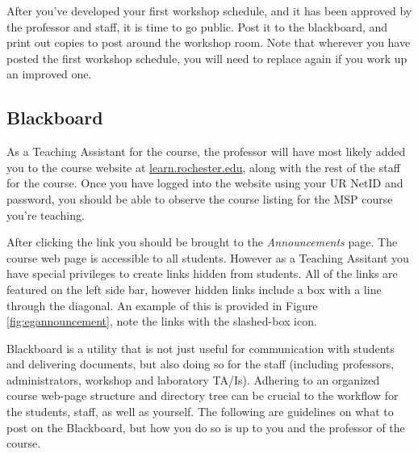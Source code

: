 \documentclass[12pt]{article}
\begin{document}
\indent After you've developed your first workshop schedule, and it has been approved by the professor and staff, it is time to go public. Post it to the blackboard, and print out copies to post around the workshop room. Note that wherever you have posted the first workshop schedule, you will need to replace again if you work up an improved one.

\subsection{Blackboard} \label{sec:bb}

As a Teaching Assistant for the course, the professor will have most likely added you to the course website at \url{learn.rochester.edu}, along with the rest of the staff for the course. Once you have logged into the website using your UR NetID and password, you should be able to observe the course listing for the MSP course you're teaching. 

\indent After clicking the link you should be brought to the \emph{Announcements} page. The course web page is accessible to all students. However as a Teaching Assitant you have special privileges to create links hidden from students. All of the links are featured on the left side bar, however hidden links include a box with a line through the diagonal. An example of this is provided in Figure \ref{fig:egannouncement}, note the links with the slashed-box icon. 

\indent Blackboard is a utility that is not just useful for communication with students and delivering documents, but also doing so for the staff (including professors, administrators, workshop and laboratory TA/Is). Adhering to an organized course web-page structure and directory tree can be crucial to the workflow for the students, staff, as well as yourself. The following are guidelines on what to post on the Blackboard, but how you do so is up to you and the professor of the course.
\end{document}
